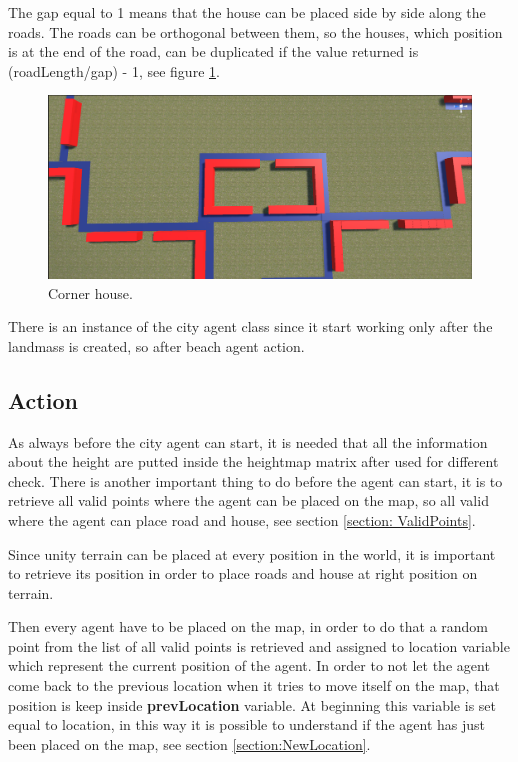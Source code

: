 \documentclass[12pt]{article}
\begin{document}
\begin{itemize}
        The gap equal to 1 means that the house can be placed side by side along the roads. The roads can be orthogonal between them, so the houses, which position is 
        at the end of the road, can be duplicated if the value returned is (roadLength/gap) - 1, see figure \ref{fig:cornerHouse}.
        
        \begin{figure}
            \centering
            \includegraphics[scale = 0.19]{images/Corner house.png}
            \caption{Corner house.}
            \label{fig:cornerHouse}
        \end{figure}
        
    \end{itemize}

    There is an instance of the city agent class since it start working only after the landmass is created, so after beach agent action.

    \subsection{Action} \label{seciton:action}
    As always before the city agent can start, it is needed that all the information about the height are putted inside the heightmap matrix after used
    for different check. There is another important thing to do before the agent can start, it is to retrieve all valid points where the agent can be placed on the
    map, so all valid where the agent can place road and house, see section \ref{section: ValidPoints}.

    Since unity terrain can be placed at every position in the world, it is important to retrieve its position in order to place roads and house at right position on 
    terrain.

    Then every agent have to be placed on the map, in order to do that a random point from the list of all valid points is retrieved and assigned to location variable
    which represent the current position of the agent. In order to not let the agent come back to the previous location when it tries to move itself on the map, that
    position is keep inside \textbf{prevLocation} variable. At beginning this variable is set equal to location, in this way it is possible to understand if the agent
    has just been placed on the map, see section \ref{section:NewLocation}.
\end{document}
